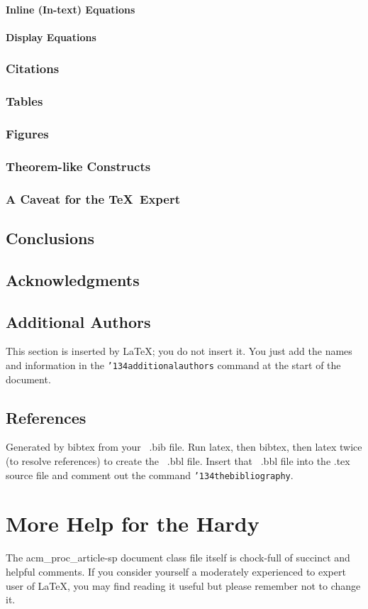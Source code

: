 \documentclass{acm_proc_article-sp}
\begin{document}
\paragraph{Inline (In-text) Equations}
\paragraph{Display Equations}
\subsubsection{Citations}
\subsubsection{Tables}
\subsubsection{Figures}
\subsubsection{Theorem-like Constructs}
\subsubsection*{A Caveat for the \TeX\ Expert}
\subsection{Conclusions}
\subsection{Acknowledgments}
\subsection{Additional Authors}
This section is inserted by \LaTeX; you do not insert it.
You just add the names and information in the
\texttt{{\char'134}additionalauthors} command at the start
of the document.
\subsection{References}
Generated by bibtex from your ~.bib file.  Run latex,
then bibtex, then latex twice (to resolve references)
to create the ~.bbl file.  Insert that ~.bbl file into
the .tex source file and comment out
the command \texttt{{\char'134}thebibliography}.
\section{More Help for the Hardy}
The acm\_proc\_article-sp document class file itself is chock-full of succinct
and helpful comments.  If you consider yourself a moderately
experienced to expert user of \LaTeX, you may find reading
it useful but please remember not to change it.
\balancecolumns
\end{document}
